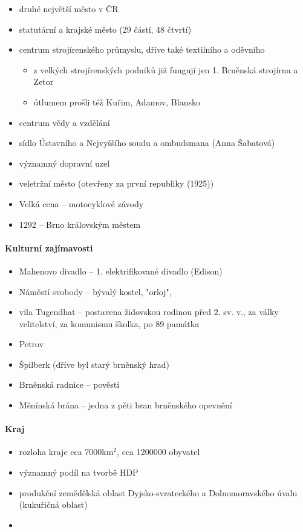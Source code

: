 \begin{itemize}
\item druhé největší město v ČR
\item statutární a krajské město (29 částí, 48 čtvrtí)
\item centrum strojírenského průmyslu, dříve také textilního a oděvního
	\begin{itemize}
	\item z velkých strojírenských podniků již fungují jen 1. Brněnská strojírna a Zetor
	\item útlumem prošli též Kuřim, Adamov, Blansko
	\end{itemize}
\item centrum vědy a vzdělání
\item sídlo Ústavního a Nejvyššího soudu a ombudsmana (Anna Šabatová)
\item významný dopravní uzel
\item veletržní město (otevřeny za první republiky (1925))
\item Velká cena -- motocyklové závody
\item 1292 -- Brno královským městem
\end{itemize}

\paragraph{Kulturní zajímavosti}
\begin{itemize}
\item Mahenovo divadlo -- 1. elektrifikované divadlo (Edison)
\item Náměstí svobody -- bývalý kostel, "orloj", \ldost
\item vila Tugendhat -- postavena židovskou rodinou před 2. sv. v., za války velitelství, za komunismu školka, po 89 památka
\item Petrov
\item Špilberk (dříve byl starý brněnský hrad)
\item Brněnská radnice -- pověsti
\item Měnínská brána -- jedna z pěti bran brněnského opevnění
\end{itemize}

\paragraph{Kraj}
\begin{itemize}
\item rozloha kraje cca 7000km$^2$, cca 1200000 obyvatel
\item významný podíl na tvorbě HDP
\item produkční zemědělská oblast Dyjsko-svrateckého a Dolnomoravského úvalu (kukuřičná oblast)
\item 
\end{itemize}

